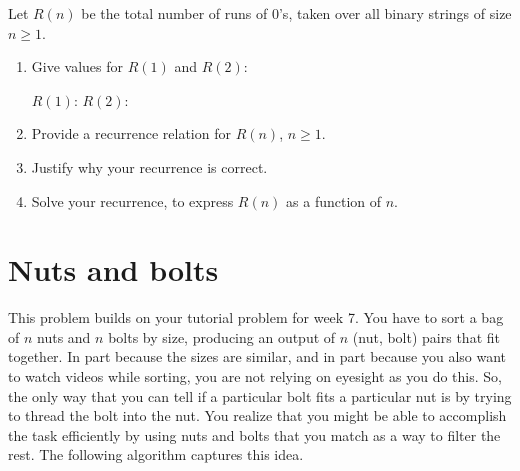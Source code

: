 \documentclass[11pt]{article}
\newcommand{\fillinblank}[1]{\fillinblankmath{\mbox{#1}}}
\newcommand{\fillinblankmath}[1]{\begingroup\setlength{\fboxsep}{1em}\setlength{\fboxrule}{2pt}\fbox{\LARGE\phantom{#1}}\endgroup}
\def\question#1{\red{#1}}
\def\red#1{{\color{red}#1}}
\begin{document}
Let $R(n)$ be the total number of runs of 0's, taken over all binary
strings of size $n \ge 1$.

\begin{enumerate}
\item \question{Give values for $R(1)$ and $R(2)$}:

\hspace{.5in}
$R(1)$: \fillinblank{?}
\hspace{.5in}
$R(2)$: \fillinblank{?}

\item \question{Provide a recurrence relation for $R(n)$, $n \ge 1$.}

\item \question{Justify why your recurrence is correct.}

\item \question{Solve your recurrence, to express $R(n)$ as a function of $n$.}
\end{enumerate}
\section{Nuts and bolts}
\label{sec-4}
This problem builds on your tutorial problem for week 7. 
You have to sort a bag of $n$ nuts and $n$ bolts by size, producing an
output of $n$ (nut, bolt) pairs that fit together.  In part because
the sizes are similar, and in part because you also want to watch
videos while sorting, you are not relying on eyesight as you do
this. So, the only way that you can tell if a particular bolt fits a
particular nut is by trying to thread the bolt into the nut.  
You realize that you might be able to accomplish the task
efficiently by using nuts and bolts that you match as a way to
filter the rest. The following algorithm captures this idea.
\end{document}
